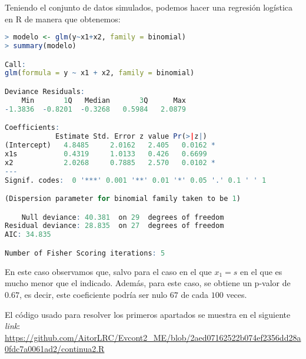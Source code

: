 \documentclass[12pt,a4paper]{article}
\begin{document}
Teniendo el conjunto de datos simulados, podemos hacer una regresión logística en R de manera que obtenemos:
\begin{lstlisting}[language=R, caption = Regresión logística, label =cod:8]
> modelo <- glm(y~x1+x2, family = binomial)
> summary(modelo)

Call:
glm(formula = y ~ x1 + x2, family = binomial)

Deviance Residuals: 
    Min       1Q   Median       3Q      Max  
-1.3836  -0.8201  -0.3268   0.5984   2.0879  

Coefficients:
            Estimate Std. Error z value Pr(>|z|)  
(Intercept)   4.8485     2.0162   2.405   0.0162 *
x1s           0.4319     1.0133   0.426   0.6699  
x2            2.0268     0.7885   2.570   0.0102 *
---
Signif. codes:  0 '***' 0.001 '**' 0.01 '*' 0.05 '.' 0.1 ' ' 1

(Dispersion parameter for binomial family taken to be 1)

    Null deviance: 40.381  on 29  degrees of freedom
Residual deviance: 28.835  on 27  degrees of freedom
AIC: 34.835

Number of Fisher Scoring iterations: 5
\end{lstlisting}
En este caso observamos que, salvo para el caso en el que $x_1 = \textit{s}$ en el que es mucho menor que el indicado. Además, para este caso, se obtiene un p-valor de $0.67$, es decir, este coeficiente podría ser nulo $67$ de cada $100$ veces.

El código usado para resolver los primeros apartados se muestra en el siguiente \textit{link}: \url{https://github.com/AitorLRC/Evcont2_ME/blob/2aed07162522b074ef2356dd28a0fdc7a0061ad2/continua2.R}
\end{document}
